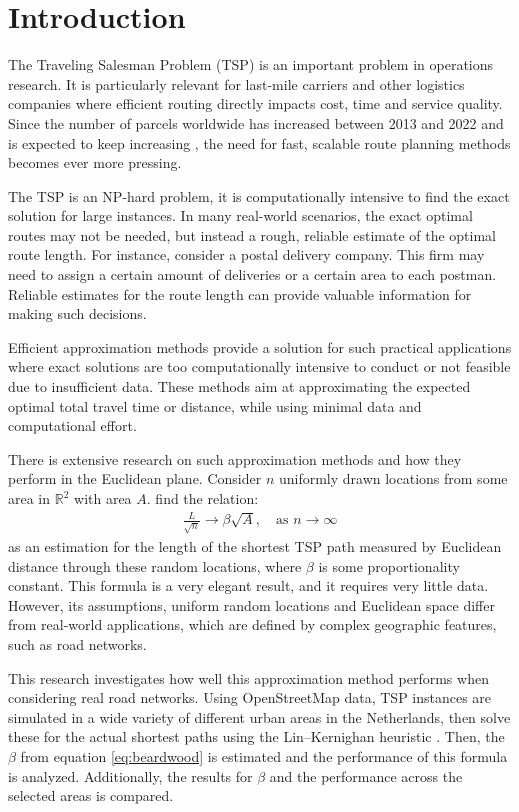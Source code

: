 \section{Introduction}
The Traveling Salesman Problem (TSP) is an important problem in operations research.
It is particularly relevant for last-mile carriers and other logistics companies where efficient
routing directly impacts cost, time and service quality. Since the number of parcels worldwide has
increased between 2013 and 2022 and is expected to keep increasing \citep{statista}, the need for
fast, scalable route planning methods becomes ever more pressing.

The TSP is an NP-hard problem, it is computationally intensive to find the exact solution for
large instances. In many real-world scenarios, the exact optimal routes may not be needed, but
instead a rough, reliable estimate of the optimal route length. For instance, consider a postal delivery company.
This firm may need to assign a certain amount of deliveries or a certain area to each postman.
Reliable estimates for the route length can provide valuable information for making such decisions.

Efficient approximation methods provide a solution for such practical applications where exact
solutions are too computationally intensive to conduct or not feasible due to insufficient data.
These methods aim at approximating the expected optimal total travel time or distance, while using
minimal data and computational effort.

There is extensive research on such approximation methods and how they perform in the Euclidean
plane.
Consider $n$ uniformly drawn locations from some area in $\mathbb{R}^2$ with area $A$.
\citet{beardwood1959shortest} find the relation:
\begin{align}
	\frac{L}{\sqrt n} \to \beta \sqrt{A}, \quad \text{as } n \to \infty
	\label{eq:beardwood}
\end{align}
as an estimation for the length of the shortest TSP path measured by Euclidean distance through
these random locations, where $\beta$ is some proportionality constant. This formula is a very
elegant result, and it requires very little data. However, its assumptions,
uniform random locations and Euclidean space differ from real-world applications, which are defined
by complex geographic features, such as road networks.

This research investigates how well this approximation method performs when considering real road
networks. Using OpenStreetMap \citep{openstreetmap} data, TSP instances are simulated in a wide variety of different urban areas
in the Netherlands, then solve these for the actual shortest paths using the Lin–Kernighan heuristic
\citep{lin1973effective}.
Then, the $\beta$ from equation \ref{eq:beardwood} is estimated and the performance of this
formula is analyzed. Additionally, the results for $\beta$ and the performance across the selected
areas is compared.

